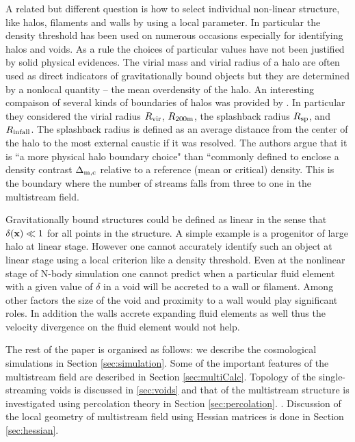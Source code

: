 \documentclass[fleqn,usenatbib,useAMS]{mnras}
\newcommand\hl{\bgroup\markoverwith
  {\textcolor{yellow}{\rule[-.5ex]{2pt}{2.5ex}}}\ULon}
\begin{document}
A related but different question is how to select individual non-linear structure, like halos, filaments and walls by using a local parameter. In particular the density threshold has been  used on numerous occasions especially for identifying halos and voids. As a rule the choices of particular values have not been justified by solid physical evidences. The virial mass and virial radius of a halo are often used as direct indicators of gravitationally bound objects but they are  determined  by a nonlocal quantity -- the mean overdensity of the halo. 
An interesting compaison of several kinds of boundaries of halos was provided by \cite{More2015}. In particular they considered  the virial radius $R_{\rm vir}$,  $R_{\rm  200m}$,  the splashback radius $R_{\rm sp}$, and $R_{\rm infall}$. The splashback
radius is defined as an average distance from the center of the halo to the most external caustic if it was resolved. The authors argue
that it is ``a more physical halo boundary choice" than ``commonly defined to enclose a density contrast $\Delta_{\rm m,c}$ relative to 
a reference (mean or critical) density.
This is the boundary where the number of streams falls from three to one in the multistream field.

Gravitationally bound structures could be defined as linear in the sense  that $\delta({\bf x}) \ll 1$ for all points in the structure. A simple example is a progenitor of large halo at linear stage. However  one cannot accurately identify such an object at linear
stage using a local criterion like a density threshold. Even at the nonlinear stage of N-body simulation one cannot predict 
when a particular fluid element with a given value of $\delta$ in a void will be accreted to a wall or filament. Among other factors 
the size of the void and proximity to a wall would play significant roles.  In addition the walls accrete expanding fluid elements
as well thus the velocity divergence on the fluid element would not help.


The rest of the paper is organised as follows: we describe the cosmological simulations in Section \ref{sec:simulation}. Some of the important features of the multistream field are described in Section \ref{sec:multiCalc}. Topology of the single-streaming voids is discussed in \ref{sec:voids} and that of the multistream structure is investigated using percolation theory in Section \ref{sec:percolation}. . Discussion of the local geometry of multistream field using Hessian matrices is done in Section \ref{sec:hessian}. 
\end{document}
